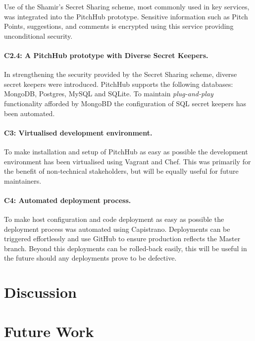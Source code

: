 Use of the Shamir's Secret Sharing scheme, most commonly used in key services, was integrated into the PitchHub prototype. Sensitive information such as Pitch Points, suggestions, and comments is encrypted using this service providing unconditional security.

\paragraph{C2.4: A PitchHub prototype with Diverse Secret Keepers.} 

In strengthening the security provided by the Secret Sharing scheme, diverse secret keepers were introduced. PitchHub supports the following databases: MongoDB, Postgres, MySQL and SQLite. To maintain \textit{plug-and-play} functionality afforded by MongoBD the configuration of SQL secret keepers has been automated.

\paragraph{C3: Virtualised development environment.}

To make installation and setup of PitchHub as easy as possible the development environment has been virtualised using Vagrant and Chef. This was primarily for the benefit of non-technical stakeholders, but will be equally useful for future maintainers.

\paragraph{C4: Automated deployment process.}
 
To make host configuration and code deployment as easy as possible the deployment process was automated using Capistrano. Deployments can be triggered effortlessly and use GitHub to ensure production reflects the Master branch. Beyond this deployments can be rolled-back easily, this will be useful in the future should any deployments prove to be defective.

\section{Discussion}



\section{Future Work}

